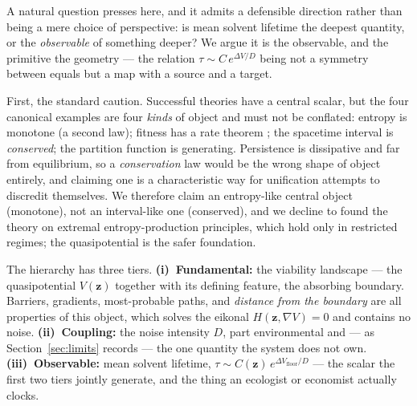 \documentclass[11pt]{article}
\theoremstyle{plain}
\theoremstyle{definition}
\begin{document}
A natural question presses here, and it admits a defensible direction rather than being a mere choice of perspective: is mean solvent lifetime the deepest quantity, or the \emph{observable} of something deeper? We argue it is the observable, and the primitive the geometry --- the relation $\tau \sim C\,e^{\Delta V/D}$ being not a symmetry between equals but a map with a source and a target.

First, the standard caution. Successful theories have a central scalar, but the four canonical examples are four \emph{kinds} of object and must not be conflated: entropy is monotone (a second law); fitness has a rate theorem \cite{fisher1930,price1972}; the spacetime interval is \emph{conserved}; the partition function is generating. Persistence is dissipative and far from equilibrium, so a \emph{conservation} law would be the wrong shape of object entirely, and claiming one is a characteristic way for unification attempts to discredit themselves. We therefore claim an entropy-like central object (monotone), not an interval-like one (conserved), and we decline to found the theory on extremal entropy-production principles, which hold only in restricted regimes; the quasipotential is the safer foundation.

The hierarchy has three tiers. \textbf{(i)~Fundamental:} the viability landscape --- the quasipotential $V(\mathbf z)$ together with its defining feature, the absorbing boundary. Barriers, gradients, most-probable paths, and \emph{distance from the boundary} are all properties of this object, which solves the eikonal $H(\mathbf z,\nabla V)=0$ and contains no noise. \textbf{(ii)~Coupling:} the noise intensity $D$, part environmental and --- as Section~\ref{sec:limits} records --- the one quantity the system does not own. \textbf{(iii)~Observable:} mean solvent lifetime, $\tau \sim C(\mathbf z)\,e^{\Delta V_{\text{floor}}/D}$ --- the scalar the first two tiers jointly generate, and the thing an ecologist or economist actually clocks.
\end{document}
